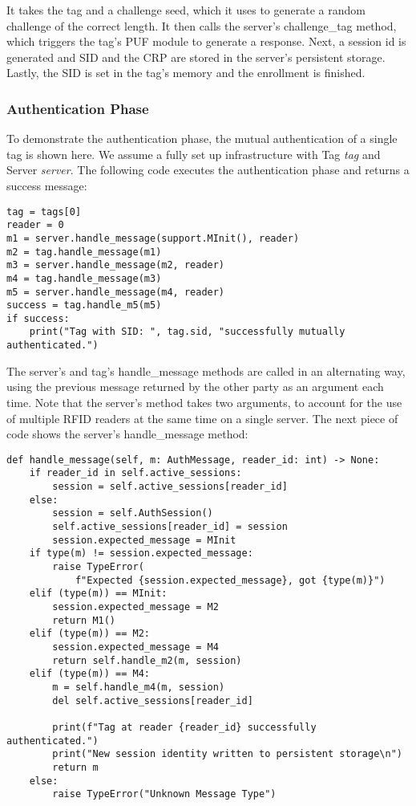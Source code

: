 It takes the tag and a challenge seed, which it uses to generate a random challenge of the correct length.
It then calls the server's challenge\_tag method, which triggers the tag's PUF module to generate a response.
Next, a session id is generated and SID and the CRP are stored in the server's persistent storage.
Lastly, the SID is set in the tag's memory and the enrollment is finished.

\subsubsection{Authentication Phase}

To demonstrate the authentication phase, the mutual authentication of a single tag is shown here.
We assume a fully set up infrastructure with Tag \emph{tag} and Server \emph{server}.
The following code executes the authentication phase and returns a success message:

\begin{lstlisting}
tag = tags[0]
reader = 0
m1 = server.handle_message(support.MInit(), reader)
m2 = tag.handle_message(m1)
m3 = server.handle_message(m2, reader)
m4 = tag.handle_message(m3)
m5 = server.handle_message(m4, reader)
success = tag.handle_m5(m5)
if success:
    print("Tag with SID: ", tag.sid, "successfully mutually authenticated.") 
\end{lstlisting}

The server's and tag's handle\_message methods are called in an alternating way,
using the previous message returned by the other party as an argument each time.
Note that the server's method takes two arguments, to account for the use of multiple
RFID readers at the same time on a single server.
The next piece of code shows the server's handle\_message method:

\begin{lstlisting}
def handle_message(self, m: AuthMessage, reader_id: int) -> None:
    if reader_id in self.active_sessions:
        session = self.active_sessions[reader_id]
    else:
        session = self.AuthSession()
        self.active_sessions[reader_id] = session
        session.expected_message = MInit
    if type(m) != session.expected_message:
        raise TypeError(
            f"Expected {session.expected_message}, got {type(m)}")
    elif (type(m)) == MInit:
        session.expected_message = M2
        return M1()
    elif (type(m)) == M2:
        session.expected_message = M4
        return self.handle_m2(m, session)
    elif (type(m)) == M4:
        m = self.handle_m4(m, session)
        del self.active_sessions[reader_id]
    
        print(f"Tag at reader {reader_id} successfully authenticated.")
        print("New session identity written to persistent storage\n")
        return m
    else:
        raise TypeError("Unknown Message Type")

\end{lstlisting}

